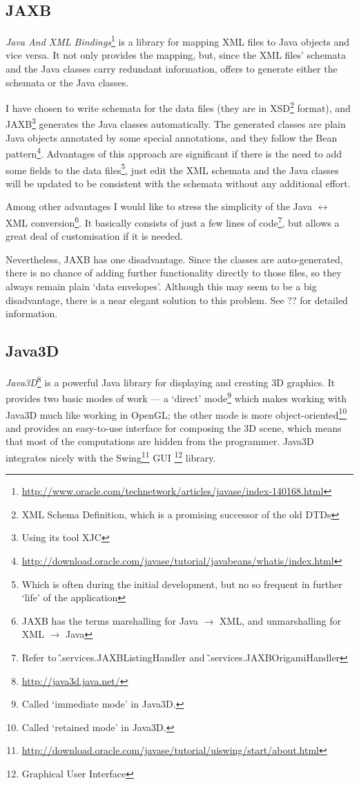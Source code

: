 \subsection{JAXB}
\emph{Java And XML Bindings}\footnote{\url{http://www.oracle.com/technetwork/articles/javase/index-140168.html}} is a library for mapping XML files to Java objects and vice versa. It not only provides the mapping, but, since the XML files' schemata and the Java classes carry redundant information, offers to generate either the schemata or the Java classes.

I have chosen to write schemata for the data files (they are in XSD\footnote{XML Schema Definition, which is a promising successor of the old DTDs} format),
and JAXB\footnote{Using its tool XJC} generates the Java classes automatically. The generated classes are plain Java objects annotated by some special annotations, and they follow the Bean pattern\footnote{\url{http://download.oracle.com/javase/tutorial/javabeans/whatis/index.html}}.  Advantages of this approach are significant if there is the need to add some fields to the data files\footnote{Which is often during the initial development, but no so frequent in further `life' of the application}, just edit the XML schemata and the Java classes will be updated to be consistent with the schemata without any additional effort.

Among other advantages I would like to stress the simplicity of the Java $\leftrightarrow$ XML conversion\footnote{JAXB has the terms marshalling for Java $\rightarrow$ XML, and unmarshalling for XML $\rightarrow$ Java}. It basically consists of just a few lines of code\footnote{Refer to \~.services.JAXBListingHandler and \~.services.JAXBOrigamiHandler}, but allows a great deal of customisation if it is needed.

Nevertheless, JAXB has one disadvantage. Since the classes are auto-generated,
there is no chance of adding further functionality directly to those files, so they always remain plain `data envelopes'.  Although this may seem to be a big disadvantage, there is a near elegant solution to this problem.  See ??  for detailed information. %

\subsection{Java3D}
\emph{Java3D}\footnote{\url{http://java3d.java.net/}} is a powerful Java library for displaying and creating 3D graphics. It provides two basic modes of work --- a `direct' mode\footnote{Called `immediate mode' in Java3D.} which makes working
with Java3D much like working in OpenGL; the other mode is more object-oriented\footnote{Called `retained mode' in Java3D.} and provides an easy-to-use interface for composing the 3D scene, which means that most of the computations are hidden from the programmer. Java3D integrates nicely with the Swing\footnote{\url{http://download.oracle.com/javase/tutorial/uiswing/start/about.html}} GUI \footnote{ Graphical User Interface} library.

